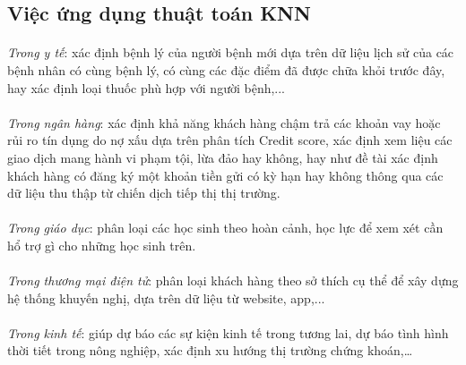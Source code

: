 \documentclass{report}
\begin{document}
        \fontsize{15}{10}\selectfont
        \subsection{Việc ứng dụng thuật toán KNN}
            \fontsize{13}{2}\selectfont\paragraph{}
                \textit{Trong y tế}: xác định bệnh lý của người bệnh mới dựa trên dữ liệu lịch sử của các bệnh nhân có cùng bệnh lý, có cùng các đặc điểm đã được chữa khỏi trước đây, hay xác định loại thuốc phù hợp với người bệnh,...
                
            \fontsize{13}{2}\selectfont\paragraph{}
                \textit{Trong ngân hàng}: xác định khả năng khách hàng chậm trả các khoản vay hoặc rủi ro tín dụng do nợ xấu dựa trên phân tích Credit score, xác định xem liệu các giao dịch mang hành vi phạm tội, lừa đảo hay không, hay như đề tài xác định khách hàng có đăng ký một khoản tiền gửi có kỳ hạn hay không thông qua các dữ liệu thu thập từ chiến dịch tiếp thị thị trường.
                
            \fontsize{13}{2}\selectfont\paragraph{}
                \textit{Trong giáo dục}: phân loại các học sinh theo hoàn cảnh, học lực để xem xét cần hổ trợ gì cho những học sinh trên.
                     
            \pagebreak
    
            \fontsize{13}{2}\selectfont\paragraph{}
                \textit{Trong thương mại điện tử}: phân loại khách hàng theo sở thích cụ thể để xây dựng hệ thống khuyến nghị, dựa trên dữ liệu từ website, app,...
            \fontsize{13}{2}\selectfont\paragraph{}
                \textit{Trong kinh tế}: giúp dự báo các sự kiện kinh tế trong tương lai, dự báo tình hình thời tiết trong nông nghiệp, xác định xu hướng thị trường chứng khoán,…
            
\end{document}
